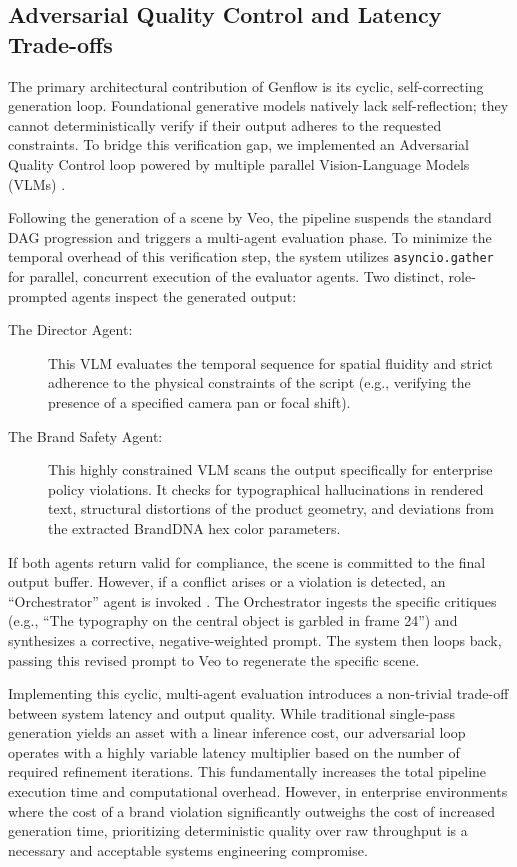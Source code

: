 \documentclass[sigconf]{acmart}
\begin{document}
\subsection{Adversarial Quality Control and Latency Trade-offs}

The primary architectural contribution of Genflow is its cyclic, self-correcting generation loop. Foundational generative models natively lack self-reflection; they cannot deterministically verify if their output adheres to the requested constraints. To bridge this verification gap, we implemented an Adversarial Quality Control loop powered by multiple parallel Vision-Language Models (VLMs) \cite{geminiteam2024gemini}.

Following the generation of a scene by Veo, the pipeline suspends the standard DAG progression and triggers a multi-agent evaluation phase. To minimize the temporal overhead of this verification step, the system utilizes \texttt{asyncio.gather} for parallel, concurrent execution of the evaluator agents. Two distinct, role-prompted agents inspect the generated output:

\begin{description}
    \item[The Director Agent:] This VLM evaluates the temporal sequence for spatial fluidity and strict adherence to the physical constraints of the script (e.g., verifying the presence of a specified camera pan or focal shift).
    \item[The Brand Safety Agent:] This highly constrained VLM scans the output specifically for enterprise policy violations. It checks for typographical hallucinations in rendered text, structural distortions of the product geometry, and deviations from the extracted BrandDNA hex color parameters.
\end{description}

If both agents return valid for compliance, the scene is committed to the final output buffer. However, if a conflict arises or a violation is detected, an ``Orchestrator'' agent is invoked \cite{liu2023visual}. The Orchestrator ingests the specific critiques (e.g., ``The typography on the central object is garbled in frame 24'') and synthesizes a corrective, negative-weighted prompt. The system then loops back, passing this revised prompt to Veo to regenerate the specific scene.

Implementing this cyclic, multi-agent evaluation introduces a non-trivial trade-off between system latency and output quality. While traditional single-pass generation yields an asset with a linear inference cost, our adversarial loop operates with a highly variable latency multiplier based on the number of required refinement iterations. This fundamentally increases the total pipeline execution time and computational overhead. However, in enterprise environments where the cost of a brand violation significantly outweighs the cost of increased generation time, prioritizing deterministic quality over raw throughput is a necessary and acceptable systems engineering compromise.
\end{document}
